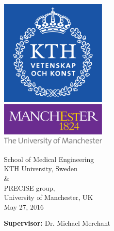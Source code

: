 \documentclass[11pt,a4paper]{article}
\begin{document}
\begin{titlepage}
\begin{center}
        \centering
        \includegraphics[width=0.4\textwidth]{img/kthlogo.png}\\
        \vspace{1.0cm}
        \includegraphics[width=0.4\textwidth]{img/manchesterlogo.png}
        
        \vspace{0.8cm}
		\large
        School of Medical Engineering\\
        KTH University, Sweden\\
        \&\\
        PRECISE group,\\
        University of Manchester, UK\\
        May 27, 2016
        
    \end{center}
    \textbf{Supervisor:} Dr. Michael Merchant
\end{titlepage}

{\let\newpage\relax}



\tableofcontents
\newpage
\end{document}
